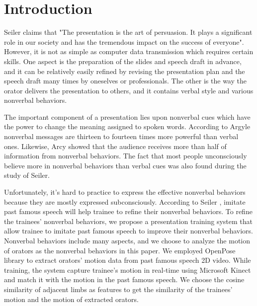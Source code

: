 \chapter{Introduction}
\par Seiler claims that "The presentation is the art of persuasion. It plays a significant role in our society and has the tremendous impact on the success of everyone"\cite{seiler2002communication}. However, it is not as simple as computer data transmission which requires certain skills\cite{rosenberg2005acoustic}. One aspect is the preparation of the slides and speech draft in advance, and it can be relatively easily refined by revising the presentation plan and the speech draft many times by oneselves or professionals. The other is the way the orator delivers the presentation to others, and it contains verbal style and various nonverbal behaviors. 
\par The important component of a presentation lies upon nonverbal cues which have the power to change the meaning assigned to spoken words\cite{seiler2002communication}. According to Argyle nonverbal messages are thirteen to fourteen times more powerful than verbal ones\cite{argyle1971communication}. Likewise, Arcy showed that the audience receives more than half of information from nonverbal behaviors\cite{d1998communicating}.  The fact that most people unconsciously believe more in nonverbal behaviors than verbal cues was also found during the study of Seiler\cite{seiler2002communication}.
\par Unfortunately, it's hard to practice to express the effective nonverbal behaviors because they are mostly expressed subconsciously. According to Seiler \cite{seiler2002communication}, imitate past famous speech will help trainee to refine their nonverbal behaviors. To refine the trainees' nonverbal behaviors, we propose a presentation training system that allow trainee to imitate past famous speech to improve their nonverbal behaviors. Nonverbal behaviors include many aspects, and we choose to analyze the motion of orators as the nonverbal behaviors in this paper. We employed OpenPose library\cite{cao2017realtime} to extract orators' motion data from past famous speech 2D video. While training, the system capture trainee's motion in real-time using Microsoft Kinect and match it with the motion in the past famous speech. We choose the cosine similarity of adjacent limbs as features to get the similarity of the trainees' motion and the motion of extracted orators.

